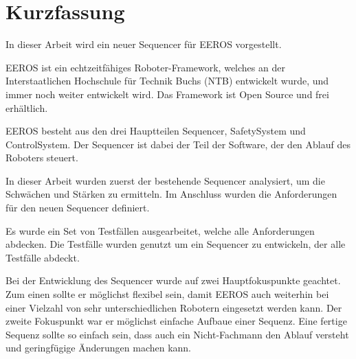 
\chapter*{Kurzfassung}
In dieser Arbeit wird ein neuer Sequencer für EEROS vorgestellt.

EEROS ist ein echtzeitfähiges Roboter-Framework, welches an der Interstaatlichen Hochschule für Technik Buchs (NTB) entwickelt wurde, und immer noch weiter entwickelt wird.
Das Framework ist Open Source und frei erhältlich.

EEROS besteht aus den drei Hauptteilen Sequencer, SafetySystem und ControlSystem.
Der Sequencer ist dabei der Teil der Software, der den Ablauf des Roboters steuert.

In dieser Arbeit wurden zuerst der bestehende Sequencer analysiert, um die Schwächen und Stärken zu ermitteln.
Im Anschluss wurden die Anforderungen für den neuen Sequencer definiert.

Es wurde ein Set von Testfällen ausgearbeitet, welche alle Anforderungen abdecken.
Die Testfälle wurden genutzt um ein Sequencer zu entwickeln, der alle Testfälle abdeckt.

Bei der Entwicklung des Sequencer wurde auf zwei Hauptfokuspunkte geachtet.
Zum einen sollte er möglichst flexibel sein, damit EEROS auch weiterhin bei einer Vielzahl von sehr unterschiedlichen Robotern eingesetzt werden kann.
Der zweite Fokuspunkt war er möglichst einfache Aufbaue einer Sequenz.
Eine fertige Sequenz sollte so einfach sein, dass auch ein Nicht-Fachmann den Ablauf versteht und geringfügige Änderungen machen kann.